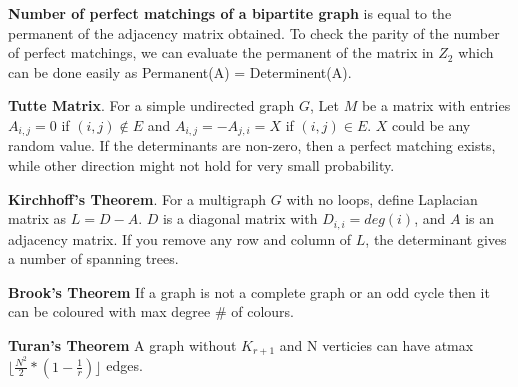 \textbf{Number of perfect matchings of a bipartite graph} is equal to the permanent of the adjacency matrix obtained. To check the parity of the number of perfect matchings, we can evaluate the permanent of the matrix in $Z_{2}$ which can be done easily as Permanent(A) = Determinent(A).

\textbf{Tutte Matrix}. For a simple undirected graph $G$, Let $M$ be a matrix with entries $A_{i, j} = 0$ if $(i, j) \notin E$ and $A_{i, j} = -A_{j, i} = X$ if $(i, j) \in E$. $X$ could be any random value. If the determinants are non-zero, then a perfect matching exists, while other direction might not hold for very small probability.

\textbf{Kirchhoff's Theorem}. For a multigraph $G$ with no loops, define Laplacian matrix as $L = D - A$. $D$ is a diagonal matrix with $D_{i, i} = deg(i)$, and $A$ is an adjacency matrix. If you remove any row and column of $L$, the determinant gives a number of spanning trees.

\textbf{Brook's Theorem} If a graph is not a complete graph or an odd cycle then it can be coloured with max degree \# of colours.

\textbf{Turan's Theorem} A graph without $K_{r+1}$ and N verticies can have atmax $\lfloor \frac{N^{2}}{2} * (1 - \frac{1}{r}) \rfloor$ edges. 
